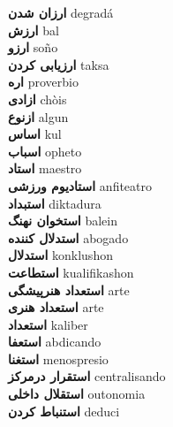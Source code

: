 \textbf{ ارزان شدن  } degradá \\
\textbf{ ارزش  } bal \\
\textbf{ ارزو  } soño \\
\textbf{ ارزیابی کردن  } taksa \\
\textbf{ اره  } proverbio \\
\textbf{ ازادی  } chòis \\
\textbf{ ازنوع  } algun \\
\textbf{ اساس  } kul \\
\textbf{ اسباب  } opheto \\
\textbf{ استاد  } maestro \\
\textbf{ استادیوم ورزشی  } anfiteatro \\
\textbf{ استبداد  } diktadura \\
\textbf{ استخوان نهنگ  } balein \\
\textbf{ استدلال کننده  } abogado \\
\textbf{ استدلال  } konklushon \\
\textbf{ استطاعت  } kualifikashon \\
\textbf{ استعداد هنرپیشگی  } arte \\
\textbf{ استعداد هنری  } arte \\
\textbf{ استعداد  } kaliber \\
\textbf{ استعفا  } abdicando \\
\textbf{ استغنا  } menospresio \\
\textbf{ استقرار درمرکز  } centralisando \\
\textbf{ استقلال داخلی  } outonomia \\
\textbf{ استنباط کردن  } deduci \\
